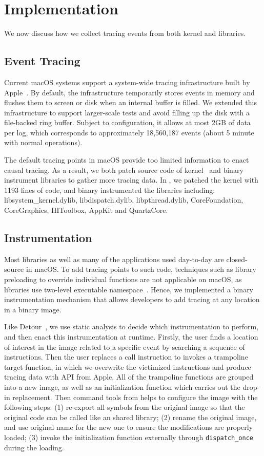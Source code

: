 \section{Implementation}\label{sec:implementation}
We now discuss how we collect tracing events from both kernel and libraries.

\subsection{Event Tracing}
Current macOS systems support a system-wide tracing infrastructure built by
Apple~\cite{linktotracetool}. By default, the infrastructure temporarily stores
events in memory and flushes them to screen or disk when an internal buffer is
filled. We extended this infrastructure to support larger-scale tests and avoid
filling up the disk with a file-backed ring buffer. Subject to configuration,
it allows at most 2GB of data per log, which corresponds to approximately
18,560,187 events (about 5 minute with normal operations).

The default tracing points in macOS provide too limited information
to enact causal tracing. As a result, we both patch source code of
kernel~\cite{linkofxnusourcecode} and binary instrument libraries to gather
more tracing data. In \xxx, we patched the kernel with 1193 lines of code,
and binary instrumented the libraries including: libsystem\_kernel.dylib,
libdispatch.dylib, libpthread.dylib, CoreFoundation, CoreGraphics, HIToolbox,
AppKit and QuartzCore.

\subsection{Instrumentation}

Most libraries as well as many of the applications used day-to-day are
closed-source in macOS. To add tracing points to such code, techniques such as
library preloading to override individual functions are not applicable on macOS,
as libraries use two-level executable namespace~\cite{twolayernamespace}. Hence,
we implemented a binary instrumentation mechanism that allows developers to add
tracing at any location in a binary image.

Like Detour~\cite{hunt1999detours}, we use static analysis to decide which
instrumentation to perform, and then enact this instrumentation at runtime.
Firstly, the user finds a location of interest in the image related to a
specific event by searching a sequence of instructions. Then the user replaces a
call instruction to invokes a trampoline target function, in which we overwrite
the victimized instructions and produce tracing data with API from Apple.
All of the trampoline functions are grouped into a new image, as well as an
initialization function which carries out the drop-in replacement. Then command
tools from \xxx helps to configure the image with the following steps: (1)
re-export all symbols from the original image so that the original code can be
called like an shared library; (2) rename the original image, and use original
name for the new one to ensure the modifications are properly loaded; (3) invoke
the initialization function externally through \texttt{dispatch\_once} during
the loading.

